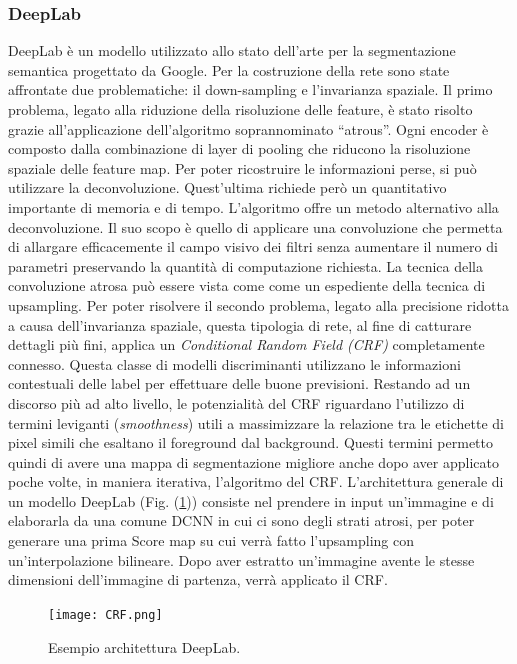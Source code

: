 \subsubsection{DeepLab}\label{DeepL}
DeepLab è un modello utilizzato allo stato dell’arte per la segmentazione semantica 
progettato da Google. Per la costruzione della rete sono state affrontate due 
problematiche: il down-sampling e l’invarianza spaziale. Il primo problema, legato 
alla riduzione della risoluzione delle feature, è stato risolto grazie all’applicazione 
dell’algoritmo soprannominato “atrous”. Ogni encoder è composto dalla combinazione 
di layer di pooling che riducono la risoluzione spaziale delle feature map. 
Per poter ricostruire le informazioni perse, si può utilizzare la deconvoluzione. 
Quest’ultima richiede però un quantitativo importante di memoria e di tempo. 
L’algoritmo offre un metodo alternativo alla deconvoluzione. Il suo scopo 
è quello di applicare una convoluzione che permetta di allargare efficacemente il 
campo visivo dei filtri senza aumentare il numero di parametri preservando la 
quantità di computazione richiesta. La tecnica della convoluzione atrosa può essere 
vista come come un espediente della tecnica di upsampling. Per poter risolvere il 
secondo problema, legato alla precisione ridotta a causa dell’invarianza spaziale, 
questa tipologia di rete, al fine di catturare dettagli più fini, applica un \emph{Conditional 
Random Field (CRF)} completamente connesso. Questa classe di modelli 
discriminanti utilizzano le informazioni contestuali delle label per effettuare delle 
buone previsioni. Restando ad un discorso più ad alto livello, le potenzialità del 
CRF riguardano l’utilizzo di termini leviganti (\emph{smoothness}) utili a massimizzare la 
relazione tra le etichette di pixel simili che esaltano il foreground dal background. 
Questi termini permetto quindi di avere una mappa di segmentazione migliore 
anche dopo aver applicato poche volte, in maniera iterativa, l’algoritmo del CRF. 
L’architettura generale di un modello DeepLab (Fig. (\ref{CRF})) consiste nel prendere in input 
un’immagine e di elaborarla da una comune DCNN in cui ci sono degli strati 
atrosi, per poter generare una prima Score map su cui verrà fatto l’upsampling 
con un’interpolazione bilineare. Dopo aver estratto un’immagine avente le stesse
dimensioni dell’immagine di partenza, verrà applicato il CRF.
\begin{figure}
    \centering
    \texttt{[image: CRF.png]}
    \centering
    \caption{Esempio architettura DeepLab.}
    \label{CRF}
\end{figure}

